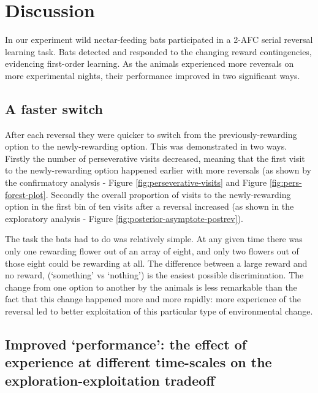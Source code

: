 \documentclass[
]{article}
\begin{document}
\hypertarget{discussion}{%
\section{Discussion}\label{discussion}}

In our experiment wild nectar-feeding bats participated in a 2-AFC serial reversal learning task. Bats detected and responded to the changing reward contingencies, evidencing first-order learning. As the animals experienced more reversals on more experimental nights, their performance improved in two significant ways.

\hypertarget{a-faster-switch}{%
\subsection{A faster switch}\label{a-faster-switch}}

After each reversal they were quicker to switch from the previously-rewarding option to the newly-rewarding option. This was demonstrated in two ways. Firstly the number of perseverative visits decreased, meaning that the first visit to the newly-rewarding option happened earlier with more reversals (as shown by the confirmatory analysis - Figure \ref{fig:perseverative-visits} and Figure \ref{fig:pers-forest-plot}. Secondly the overall proportion of visits to the newly-rewarding option in the first bin of ten visits after a reversal increased (as shown in the exploratory analysis - Figure \ref{fig:posterior-asymptote-postrev}).

The task the bats had to do was relatively simple. At any given time there was only one rewarding flower out of an array of eight, and only two flowers out of those eight could be rewarding at all. The difference between a large reward and no reward, (`something' vs `nothing') is the easiest possible discrimination. The change from one option to another by the animals is less remarkable than the fact that this change happened more and more rapidly: more experience of the reversal led to better exploitation of this particular type of environmental change.

\hypertarget{improved-performance-the-effect-of-experience-at-different-time-scales-on-the-exploration-exploitation-tradeoff}{%
\subsection{Improved `performance': the effect of experience at different time-scales on the exploration-exploitation tradeoff}\label{improved-performance-the-effect-of-experience-at-different-time-scales-on-the-exploration-exploitation-tradeoff}}
\end{document}
